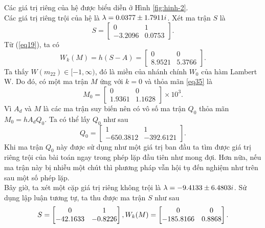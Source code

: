 Các giá trị riêng của hệ được biểu diễn ở Hình \ref{fig:hinh-2}.\\
Các giá trị riêng trội của hệ là $\lambda = 0.0377 \pm 1.7911i$. Xét ma trận $S$ là
\begin{equation}\label{eq34}
	S= \begin{bmatrix}
		0 & 1 \\ -3.2096 & 0.0753
	\end{bmatrix}.
\end{equation}
Từ (\ref{eq19}), ta có
\begin{equation}\label{eq35}
	W_k(M) = h  (S-A) = \begin{bmatrix}
		0 & 0 \\ 8.9521 & 5.3766
	\end{bmatrix}.
\end{equation}
Ta thấy $W(m_{22}) \in [-1, \infty)$, đó là miền của nhánh chính $W_0$ của hàm Lambert W. Do đó, có một ma trận $M$ ứng với $k =0$ và thỏa mãn \eqref{eq35} là
\begin{equation}\label{eq36}
	M_0 = \begin{bmatrix}
		0 & 0\\ 1.9361 &1.1628
	\end{bmatrix} \times 10^3 .
\end{equation}
Vì $A_d$ và $M$ là các ma trận suy biến nên có vô số ma trận $Q_0$ thỏa mãn $M_0 = h  A_d Q_0$. Ta có thể lấy $Q_0$ như sau
\begin{equation}\label{eq37}
	Q_0 = \begin{bmatrix}
		1 & 1\\ -650.3812 &-392.6121
	\end{bmatrix} .
\end{equation}
Khi ma trận $Q_0$ này được sử dụng như một giá trị ban đầu ta tìm được giá trị riêng trội của bài toán ngay trong phép lặp đầu tiên như mong đợi. Hơn nữa, nếu ma trận này bị nhiễu một chút thì phương pháp vẫn hội tụ đến nghiệm như trên sau một số phép lặp.\\
Bây giờ, ta xét một cặp giá trị riêng không trội là $\lambda = -9.4133 \pm 6.4803i$. Sử dụng lập luận tương tự, ta thu được ma trận $S$ như sau
\begin{equation}\label{eq38}
	S=\begin{bmatrix}
		0&1\\-42.1633 & -0.8226
	\end{bmatrix},\\
	W_k(M)=\begin{bmatrix}
		0 & 0\\ -185.8166 & 0.8868
	\end{bmatrix}.
\end{equation}

